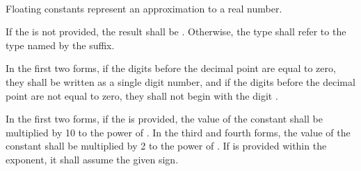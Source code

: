 \begin{grammar}
 \oneof \\
        \terminal{+}
        \terminal{-} \\

 \oneof \\
         \\

 \oneof \\
         \\
\end{grammar}

Floating constants represent an approximation to a real number.

\specsubitem
If the  is not provided, the result shall be
. Otherwise, the type shall refer to the type named by the
suffix.

\specsubitem
In the first two forms, if the digits before the decimal point are equal to
zero, they shall be written as a single digit number, and if the digits before
the decimal point are not equal to zero, they shall not begin with the digit
.

\specsubitem
In the first two forms, if the  is provided, the
value of the constant shall be multiplied by 10 to the power of
. In the third and fourth forms, the value of the
constant shall be multiplied by 2 to the power of .
If  is provided within the exponent, it shall assume the given
sign.


